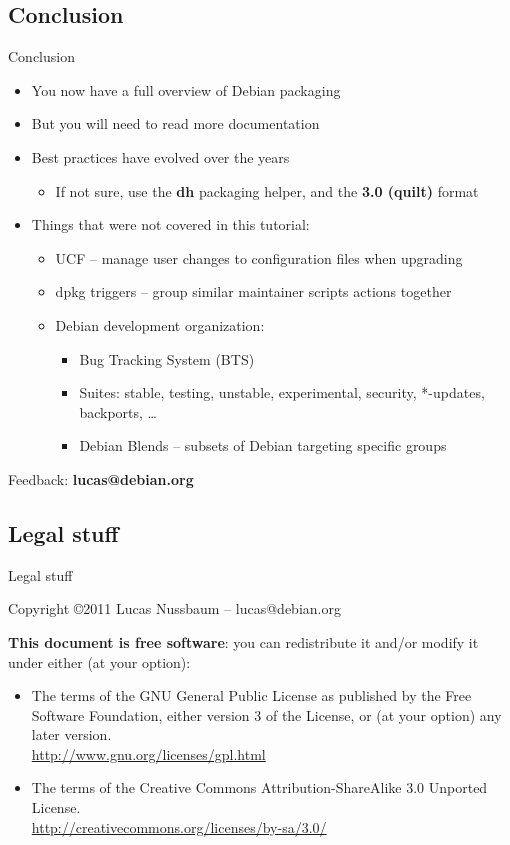 \documentclass[10pt,final]{beamer}
\begin{document}
\subsection{Conclusion}
\begin{frame}{Conclusion}
  \begin{itemize}
  \item You now have a full overview of Debian packaging
    \br
  \item But you will need to read more documentation
    \br
  \item Best practices have evolved over the years
    \begin{itemize}
    \item If not sure, use the \textbf{dh} packaging helper, and the \textbf{3.0 (quilt)} format
    \end{itemize}
    \br
  \item Things that were not covered in this tutorial:
    \begin{itemize}
	\item UCF -- manage user changes to configuration files when upgrading
		\hbr
	\item dpkg triggers -- group similar maintainer scripts actions together
		\hbr
	\item Debian development organization:
		\begin{itemize}
			\item Bug Tracking System (BTS)
			\item Suites: stable, testing, unstable, experimental, security, *-updates, backports, \ldots
			\item Debian Blends -- subsets of Debian targeting specific groups
		\end{itemize}
		\end{itemize}
  \end{itemize}
  \vfill
  \centerline{\large Feedback: \textbf{lucas@debian.org}}
\end{frame}

\subsection{Legal stuff}
\begin{frame}{Legal stuff}

  Copyright \copyright 2011 Lucas Nussbaum -- lucas@debian.org
  \br

  {\small 
    \textbf{This document is free software}: you can redistribute it and/or modify
    it under either (at your option):
    \hbr
    \begin{itemize}
    \item The terms of the GNU General Public License as published by the Free
      Software Foundation, either version 3 of the License, or
      (at your option) any later version.\\
      \url{http://www.gnu.org/licenses/gpl.html} \br
    \item The terms of the Creative Commons Attribution-ShareAlike 3.0 Unported
      License.\\ 
      \url{http://creativecommons.org/licenses/by-sa/3.0/}
    \end{itemize}
  }
\end{frame}
\end{document}
